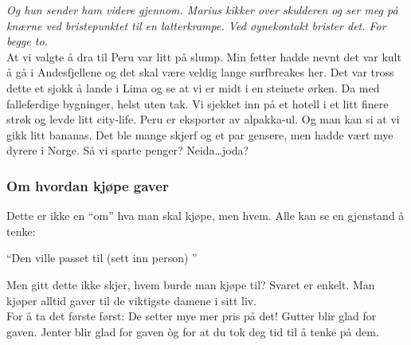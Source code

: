 \textit{Og hun sender ham videre
gjennom. Marius kikker over skulderen og ser meg på knærne ved bristepunktet til en latterkrampe. Ved øynekontakt
brister det. For begge to.} \\

At vi valgte å dra til Peru var litt på slump. Min fetter hadde nevnt
det var kult å gå i Andesfjellene og det skal være veldig lange
surfbreakes her. Det var tross dette et sjokk å lande i Lima og se at
vi er midt i en steinete ørken. Da med falleferdige bygninger, helst
uten tak. Vi sjekket inn på et hotell i et litt finere strøk og levde
litt city-life. Peru er eksportør av alpakka-ul. Og man kan si at vi
gikk litt bananas. Det ble mange skjerf og et par gensere, men hadde
vært mye dyrere i Norge. Så vi sparte penger? Neida\ldots joda?
\begin{figure}[H]
	\centering
	\noindent{}
	\caption*{}
	\label{fig:skiltopp}
\end{figure}
\subsubsection{Om hvordan kjøpe gaver}
Dette er ikke en ``om'' hva man skal kjøpe, men hvem. Alle
kan se en gjenstand å tenke:
\begin{dialogue}
	\item ``Den ville passet til (sett inn person) ''
\end{dialogue}
Men gitt dette ikke skjer, hvem burde man kjøpe til? Svaret er
enkelt. Man kjøper alltid gaver til de viktigste damene i sitt liv.\\
For å ta det første først: De setter mye mer pris på det! Gutter blir
glad for gaven. Jenter blir glad for gaven òg for at du tok deg tid
til å tenke på dem.

